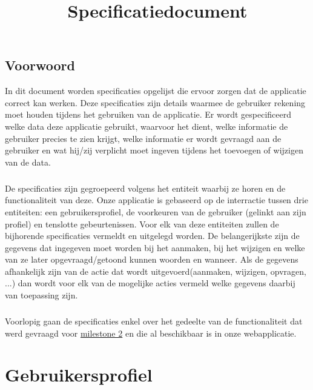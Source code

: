 \documentclass{scrbook}
\title{Specificatiedocument}
\begin{document}


\section*{Voorwoord}
In dit document worden specificaties opgelijst die ervoor zorgen dat de applicatie correct kan werken. Deze specificaties zijn details waarmee de gebruiker rekening moet houden tijdens het gebruiken van de applicatie. Er wordt  gespecificeerd welke data deze applicatie gebruikt, waarvoor het dient, welke informatie de gebruiker precies te zien krijgt, welke informatie er wordt gevraagd aan de gebruiker en wat hij/zij verplicht moet ingeven tijdens het toevoegen of wijzigen van de data.

\paragraph{}De specificaties zijn gegroepeerd volgens het entiteit waarbij ze horen en de functionaliteit van deze. Onze applicatie is gebaseerd op de interractie tussen drie entiteiten: een gebruikersprofiel, de voorkeuren van de gebruiker (gelinkt aan zijn profiel) en tenslotte gebeurtenissen. Voor elk van deze entiteiten zullen de bijhorende specificaties vermeldt en uitgelegd worden. De belangerijkste zijn de gegevens dat ingegeven moet worden bij het aanmaken, bij het wijzigen en welke van ze later opgevraagd/getoond kunnen woorden en wanneer. Als de gegevens afhankelijk zijn van de actie dat wordt uitgevoerd(aanmaken, wijzigen, opvragen, ...) dan wordt voor elk van de mogelijke acties vermeld welke gegevens daarbij van toepassing zijn.

\paragraph{}Voorlopig gaan de specificaties enkel over het gedeelte van de functionaliteit dat werd gevraagd voor \href{https://github.ugent.be/pages/VakOverschrijdendProject/opgave/#toc2}{milestone 2} en die al beschikbaar is in onze webapplicatie.

\newpage
\tableofcontents


\chapter{Gebruikersprofiel}\label{profile}
\end{document}
